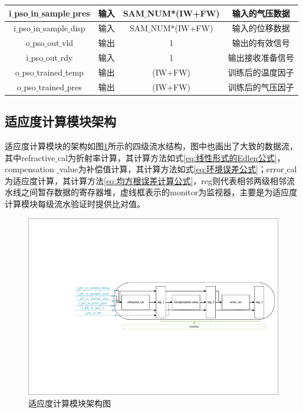 \begin{table}[H]
\begin{tabular}{c|c|c|c}
        i$\_$pso$\_$in$\_$sample$\_$pres            & 输入      & SAM$\_$NUM*(IW+FW)    & 输入的气压数据            \\ \hline
        i$\_$pso$\_$in$\_$sample$\_$disp            & 输入      & SAM$\_$NUM*(IW+FW)    & 输入的位移数据            \\ \hline
        o$\_$pso$\_$out$\_$vld                      & 输出      & 1                     & 输出的有效信号            \\ \hline
        i$\_$pso$\_$out$\_$rdy                      & 输入      & 1                     & 输出接收准备信号          \\ \hline
        o$\_$pso$\_$trained$\_$temp                 & 输出      & (IW+FW)               & 训练后的温度因子          \\ \hline
        o$\_$pso$\_$trained$\_$pres                 & 输出      & (IW+FW)               & 训练后的气压因子          \\ \hline
    \end{tabular}
  \end{table}

\subsection{适应度计算模块架构}
适应度计算模块的架构如图\ref{fig:适应度计算模块架构图}所示的四级流水结构，图中也画出了大致的数据流，其中refractive$\_$cal为折射率计算，其计算方法如式\eqref{eq:线性形式的Edlen公式}，compensation $\_$value为补偿值计算，其计算方法如式\eqref{eq:环境误差公式}；error$\_$cal为适应度计算，其计算方法\eqref{eq:均方根误差计算公式}，reg则代表相邻两级相邻流水线之间暂存数据的寄存器堆，虚线框表示的monitor为监视器，主要是为适应度计算模块每级流水验证时提供比对值。
  \begin{figure}[htb]
    \centering
    \includegraphics[width=14cm]{fig/5-fig/适应度计算模块架构图.pdf}
    \caption{适应度计算模块架构图}
    \label{fig:适应度计算模块架构图}
\end{figure}

